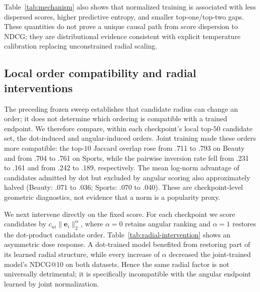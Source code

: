 \documentclass[sigconf,anonymous,review]{acmart}
\begin{document}
Table~\ref{tab:mechanism} also shows that normalized training is associated with less dispersed scores, higher predictive entropy, and smaller top-one/top-two gaps. These quantities do not prove a unique causal path from score dispersion to NDCG; they are distributional evidence consistent with explicit temperature calibration replacing unconstrained radial scaling.

\subsection{Local order compatibility and radial interventions}
The preceding frozen sweep establishes that candidate radius can change an order; it does not determine which ordering is compatible with a trained endpoint. We therefore compare, within each checkpoint's local top-$50$ candidate set, the dot-induced and angular-induced orders. Joint training made these orders more compatible: the top-$10$ Jaccard overlap rose from .711 to .793 on Beauty and from .704 to .761 on Sports, while the pairwise inversion rate fell from .231 to .161 and from .242 to .189, respectively. The mean log-norm advantage of candidates admitted by dot but excluded by angular scoring also approximately halved (Beauty: .071 to .036; Sports: .070 to .040). These are checkpoint-level geometric diagnostics, not evidence that a norm is a popularity proxy.

We next intervene directly on the fixed score. For each checkpoint we score candidates by $c_{ui}\|\bm e_i\|_2^\alpha$, where $\alpha=0$ retains angular ranking and $\alpha=1$ restores the dot-product candidate order. Table~\ref{tab:radial-intervention} shows an asymmetric dose response. A dot-trained model benefited from restoring part of its learned radial structure, while every increase of $\alpha$ decreased the joint-trained model's NDCG@10 on both datasets. Hence the same radial factor is not universally detrimental; it is specifically incompatible with the angular endpoint learned by joint normalization.
\begin{table}[t]
\caption{Frozen radial intervention and exact-frequency-matched norm permutation. NDCG@10; no model is retrained. ``Perm.'' averages three independent permutations of norms within exact training-frequency bins.}\label{tab:radial-intervention}
\centering\scriptsize
{}
\end{table}
\end{document}
